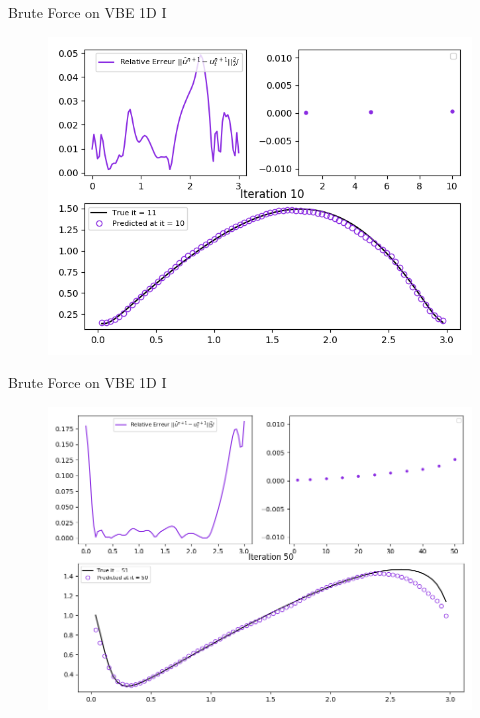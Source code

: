 \documentclass[10pt,
			   xcolor=svgnames,
			   hyperref={linkcolor=red, citecolor = DarkGreen, colorlinks=true, urlcolor=Navy}]{beamer}
\begin{document}
\begin{frame}{Brute Force on VBE 1D I}
	\begin{figure}[H]
	\centering
	\includegraphics[scale=0.5]{Pres_Tenth_Iteration_1.png}
	\end{figure} 
\end{frame}

\begin{frame}{Brute Force on VBE 1D I}
	\begin{figure}[H]
	\centering
	\includegraphics[scale=0.35]{Pres_50th_Iteration_1.png}
	\end{figure} 
\end{frame}
\end{document}
